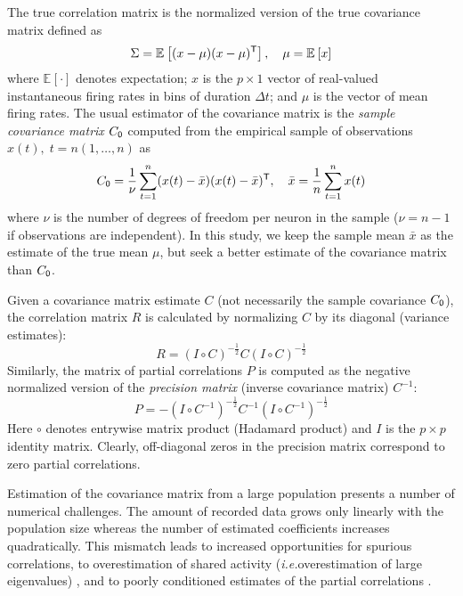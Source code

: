 \documentclass[10pt]{article}
\newcommand{\T}{{\sf T}}
\newcommand{\E}[2][]{\mathbb E_{#1}\left[ #2\right]}    %
\begin{document}
The true correlation matrix is the normalized version of the true covariance matrix defined as
\begin{equation}\label{eq:true-covariance}
    \Sigma = \E{(x-\mu)(x-\mu)^\T},\quad \mu = \E{x}
\end{equation}
where $\E{\cdot}$ denotes expectation; $x$ is the $p\times 1$ vector of real-valued instantaneous firing rates in bins of duration $\Delta t$; and $\mu$ is the vector of mean firing rates.  The usual estimator of the covariance matrix is the \emph{sample covariance matrix} $C_{\sf 0}$ computed from the empirical sample of observations $x(t),\; t=n(1,\ldots,n)$ as
\begin{equation}
    C_{\sf 0} = \frac 1 \nu \sum\limits_{t=1}^n (x(t)-\bar x)(x(t)-\bar x)^\T,\quad \bar x= \frac 1 n \sum\limits_{t=1}^n x(t)
\end{equation}
where $\nu$ is the number of degrees of freedom per neuron in the sample ($\nu=n-1$ if observations are independent). In this study, we keep the sample mean $\bar x$ as the estimate of the true mean $\mu$, but seek a better estimate of the covariance matrix than $C_{\sf 0}$.

Given a covariance matrix estimate $C$ (not necessarily the sample covariance $C_{\sf 0}$), the correlation matrix $R$ is calculated by normalizing $C$ by its diagonal (variance estimates):
\begin{equation}
    R = \left(I\circ C\right)^{-\frac 1 2} C \left(I\circ C\right)^{-\frac 1 2}
\end{equation}
Similarly, the matrix of partial correlations $P$ is computed as the negative normalized version of the \emph{precision matrix} (inverse covariance matrix) $C^{-1}$:
\begin{equation}
    P = -\left(I\circ C^{-1}\right)^{-\frac 1 2} C^{-1} \left(I\circ C^{-1}\right)^{-\frac 1 2}
\end{equation}
Here $\circ$ denotes entrywise matrix product (Hadamard product) and $I$ is the $p\times p$ identity matrix. Clearly, off-diagonal zeros in the precision matrix correspond to zero partial correlations. 

Estimation of the covariance matrix from a large population presents a number of numerical challenges.  The amount of recorded data grows only linearly with the population size whereas the number of estimated coefficients increases quadratically.  This mismatch leads to increased opportunities for spurious correlations, to overestimation of shared activity (\emph{i.e.}\;overestimation of large eigenvalues) \cite{Ledoit:2004}, and to poorly conditioned estimates of the partial correlations \cite{Schafer:2005}.
\end{document}
